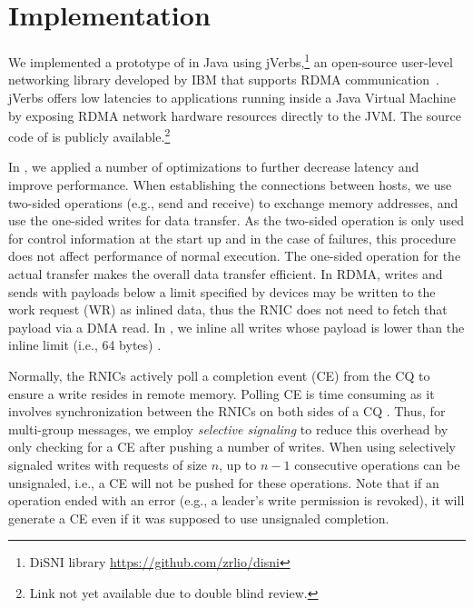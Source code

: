 \section{Implementation}
\label{sec:implementation}

%

We implemented a prototype of \libname in Java using jVerbs,\footnote{DiSNI
library \url{https://github.com/zrlio/disni}} an
open-source user-level networking library developed by IBM that supports RDMA
communication~\cite{stuedi2013jverbs}. jVerbs offers low latencies to applications running inside a Java
Virtual Machine by exposing RDMA network hardware resources directly to the JVM.
The source code of \libname is publicly available.\footnote{Link not yet available due to double blind review.}

In \libname, we applied a number of optimizations to further decrease latency
and improve performance. When establishing the connections between hosts, we
use two-sided operations (e.g., send and receive) to exchange memory addresses, and
use the one-sided writes for data transfer. As the two-sided operation is only
used for control information at the start up and in the case of failures, this procedure
does not affect performance of normal execution.
The one-sided operation for the actual
transfer makes the overall data transfer efficient. In RDMA, writes and sends
with payloads below a limit specified by devices may be written to the work
request (WR) as inlined data, thus the RNIC does not need to fetch that payload
via a DMA read. In \libname, we inline all writes whose payload is lower than
the inline limit (i.e., 64 bytes) \cite{mitchell2013using}.

Normally, the RNICs actively poll a completion event (CE) from the CQ to ensure
a write resides in remote memory. Polling CE is time consuming as it involves
synchronization between the RNICs on both sides of a CQ \cite{APUS}. Thus,
for multi-group messages, we
employ \emph{selective signaling} \cite{Kalia2014} to reduce this overhead by
only checking for a CE after pushing a number of writes. When using 
selectively signaled writes with requests of size $n$, up to $n-1$ consecutive
operations can be unsignaled, i.e., a CE will not be pushed for these
operations. Note that if an operation ended with an error (e.g., a leader's
write permission is revoked), it will generate a CE even if it was supposed to use
unsignaled completion.

